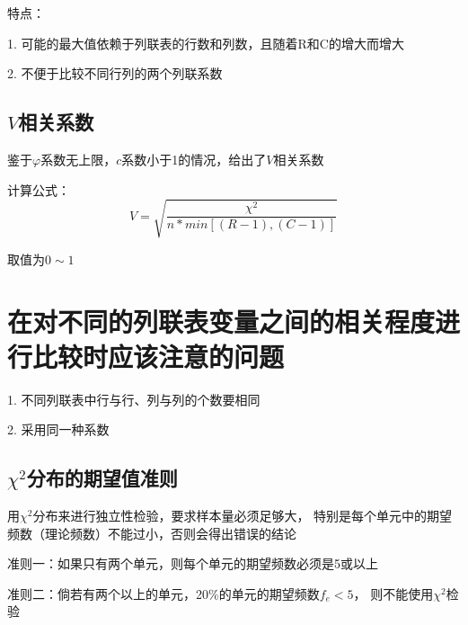 \documentclass[UTF8,10pt]{book}
\begin{document}
特点： 

1. 可能的最大值依赖于列联表的行数和列数，且随着R和C的增大而增大 

2. 不便于比较不同行列的两个列联系数	


\subsection{$V$相关系数}	
鉴于$\varphi$系数无上限，$c$系数小于1的情况，给出了$V$相关系数 

计算公式： 
$$V = \sqrt{\frac{\chi^2}{n*min[(R-1),(C-1)]}}$$ 

取值为$0 \sim 1$	

\section{在对不同的列联表变量之间的相关程度进行比较时应该注意的问题}	

1. 不同列联表中行与行、列与列的个数要相同 

2. 采用同一种系数	

\subsection{$\chi^2$分布的期望值准则}	

用$\chi^2$分布来进行独立性检验，要求样本量必须足够大，
特别是每个单元中的期望频数（理论频数）不能过小，否则会得出错误的结论 

准则一：如果只有两个单元，则每个单元的期望频数必须是5或以上 

准则二：倘若有两个以上的单元，20\%的单元的期望频数$f_e<5$，
则不能使用$\chi^2$检验	
\end{document}
